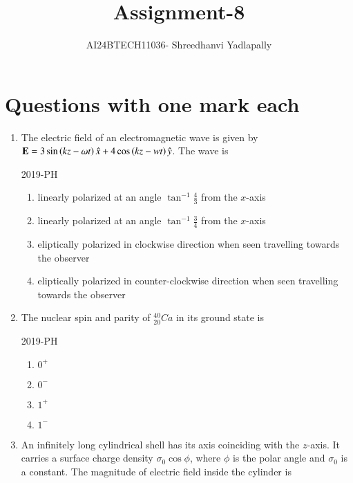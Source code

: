 \documentclass[journal,12pt,onecolumn]{IEEEtran}
\theoremstyle{remark}
\begin{document}

\vspace{3cm}

\title{Assignment-8}
\author{AI24BTECH11036- Shreedhanvi Yadlapally}
\maketitle

\bigskip
\renewcommand{\thefigure}{\theenumi}
\renewcommand{\thetable}{\theenumi}
\section{Questions with one mark each}

\begin{enumerate}

\item The electric field of an electromagnetic wave is given by $\mathbf{E}=3 \sin \left(kz-\omega t\right)\hat{x} + 4 \cos \left(kz-wt\right)\hat{y}$. The wave is

\hfill{2019-PH}
	\begin{enumerate}
	\item linearly polarized at an angle $\tan ^{-1} \frac{4}{3}$ from the $x$-axis
	\item linearly polarized at an angle $\tan ^{-1} \frac{3}{4}$ from the $x$-axis
	\item eliptically polarized in clockwise direction when seen travelling towards the observer
	\item eliptically polarized in counter-clockwise direction when seen travelling towards the observer
	\end{enumerate}

\item The nuclear spin and parity of $^{40} _{20} Ca$ in its ground state is

\hfill{2019-PH}

	\begin{enumerate}
	\item $0^{+}$
	\item $0^{-}$
	\item $1^{+}$
	\item $1^{-}$
	\end{enumerate}

\item An infinitely long cylindrical shell has its axis coinciding with the $z$-axis. It carries a surface charge density $\sigma_{0} \cos \phi$, where $\phi$ is the polar angle and $\sigma_{0}$ is a constant. The magnitude of electric field inside the cylinder is


\end{enumerate}
\end{document}
